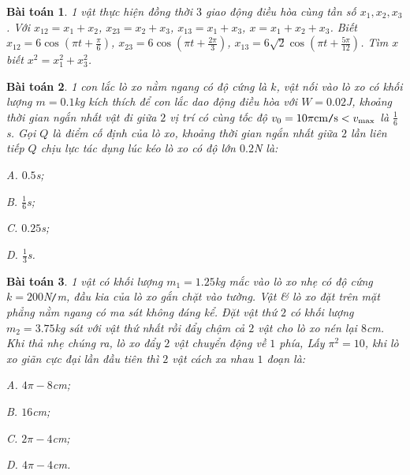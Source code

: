 \documentclass{article}
\numberwithin{equation}{section}
\newtheorem{baitoan}{Bài toán}[section]
\begin{document}
\begin{baitoan}
	1 vật thực hiện đồng thời $3$ giao động điều hòa cùng tần số $x_1,x_2,x_3$. Với $x_{12} = x_1 + x_2$, $x_{23} = x_2 + x_3$, $x_{13} = x_1 + x_3$, $x = x_1 + x_2 + x_3$. Biết $x_{12} = 6\cos\left(\pi t + \frac{\pi}{6}\right)$, $x_{23} = 6\cos\left(\pi t + \frac{2\pi}{3}\right)$, $x_{13} = 6\sqrt{2}\cos\left(\pi t + \frac{5\pi}{12}\right)$. Tìm $x$ biết $x^2 = x_1^2 + x_3^2$.
\end{baitoan}

\begin{baitoan}
	1 con lắc lò xo nằm ngang có độ cứng là $k$, vật nối vào lò xo có khối lượng $m = 0.1$kg kích thích để con lắc dao động điều hòa với $W = 0.02$J, khoảng thời gian ngắn nhất vật đi giữa $2$ vị trí có cùng tốc độ $v_0 = 10\pi{\rm cm\texttt{/}s} < v_{\max}$ là $\frac{1}{6}$s. Gọi $Q$ là điểm cố định của lò xo, khoảng thời gian ngắn nhất giữa $2$ lần liên tiếp $Q$ chịu lực tác dụng lúc kéo lò xo có độ lớn $0.2$N là:
	\begin{enumerate*}
		\item[{\rm\sf A.}] $0.5$s;
		\item[{\rm\sf B.}] $\frac{1}{6}$s; 
		\item[{\rm\sf C.}] $0.25$s;
		\item[{\rm\sf D.}] $\frac{1}{3}$s.
	\end{enumerate*}
\end{baitoan}

\begin{baitoan}
	1 vật có khối lượng $m_1 = 1.25$kg mắc vào lò xo nhẹ có độ cứng $k = 200$\emph{N\texttt{/}m}, đầu kia của lò xo gắn chặt vào tường. Vật \& lò xo đặt trên mặt phẳng nằm ngang có ma sát không đáng kể. Đặt vật thứ $2$ có khối lượng $m_2 = 3.75$kg sát với vật thứ nhất rồi đẩy chậm cả $2$ vật cho lò xo nén lại $8$cm. Khi thả nhẹ chúng ra, lò xo đẩy $2$ vật chuyển động về $1$ phía, Lấy $\pi^2 = 10$, khi lò xo giãn cực đại lần đầu tiên thì $2$ vật cách xa nhau $1$ đoạn là:
	\begin{enumerate*}
		\item[{\rm\sf A.}] $4\pi - 8$cm;
		\item[{\rm\sf B.}] $16$cm;
		\item[{\rm\sf C.}] $2\pi - 4$cm;
		\item[{\rm\sf D.}] $4\pi - 4$cm.
	\end{enumerate*}
\end{baitoan}

\end{document}
